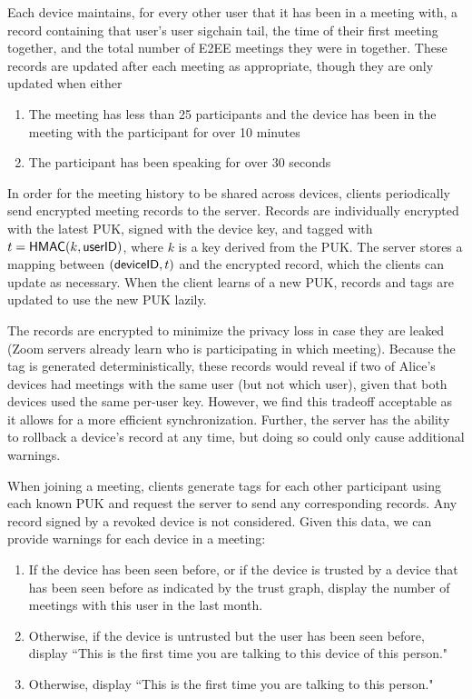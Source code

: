 Each device maintains, for every other user that it has been in a meeting with, a record containing
that user's user sigchain tail, the time of their first meeting together, and the total number of
E2EE meetings they were in together. These records are updated after each meeting as appropriate,
though they are only updated when either
\begin{enumerate}
\item The meeting has less than 25 participants and the device has been in the meeting with the participant for over 10 minutes
\item The participant has been speaking for over 30 seconds
\end{enumerate}

In order for the meeting history to be shared across devices, clients periodically send encrypted meeting records to the server. Records are individually encrypted with the latest PUK, signed with the device key, and tagged with $t = \mathsf{HMAC}(k, \mathsf{userID})$, where $k$ is a key derived from the PUK. The server stores a mapping between $({\sf deviceID}, t)$ and the encrypted record, which the clients can update as necessary. When the client learns of a new PUK, records and tags are updated to use the new PUK lazily.

The records are encrypted to minimize the privacy loss in case they are leaked (Zoom servers already learn who is participating in which meeting). Because the tag is generated deterministically, these records would reveal if two of Alice's devices had meetings with the same user (but not which user), given that both devices used the same per-user key. However, we find this tradeoff acceptable as it allows for a more efficient synchronization.
Further, the server has the ability to rollback a device's record at any time, but doing so could only cause additional warnings.

When joining a meeting, clients generate tags for each other participant using each known PUK
and request the server to send any corresponding records. Any record signed by a revoked device is not considered. Given this data, we can provide warnings for
each device in a meeting:
\begin{enumerate}
\item If the device has been seen before, or if the device is trusted by a device that has been seen
    before as indicated by the trust graph, display the number of meetings with this user in the
    last month.
\item Otherwise, if the device is untrusted but the user has been seen before, display ``This is the
    first time you are talking to this device of this person."
\item Otherwise, display ``This is the first time you are talking to this person."
\end{enumerate}

